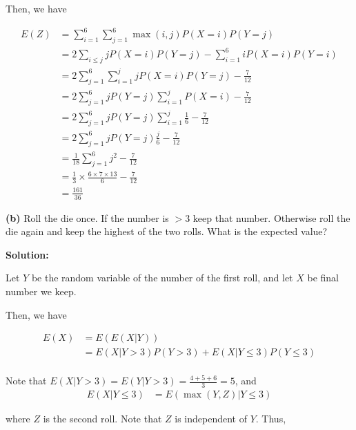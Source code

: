 \documentclass[11pt]{article}
\renewcommand\part[1]{\vspace{.10in}\textbf{(#1)}}
\newcommand{\solution}{\vspace{.10in}\textbf{Solution: }}
\begin{document}
Then, we have

\begin{align*}
    E(Z) &= \sum_{i=1}^{6}\sum_{j=1}^{6}\max(i,j)P(X=i)P(Y=j) \\
         &= 2\sum_{i \le j}jP(X=i)P(Y=j) - \sum_{i=1}^{6}iP(X=i)P(Y=i) \\
         &= 2\sum_{j=1}^{6}\sum_{i=1}^{j} jP(X=i)P(Y=j) - \frac{7} {12} \\
         &= 2\sum_{j=1}^{6} jP(Y=j) \sum_{i=1}^{j} P(X=i) - \frac{7} {12}\\
         &= 2\sum_{j=1}^{6} jP(Y=j) \sum_{i=1}^{j} \frac{1}{6}- \frac{7} {12} \\
         &= 2\sum_{j=1}^{6} jP(Y=j) \frac{j}{6} - \frac{7} {12}\\
         &= \frac{1}{18}\sum_{j=1}^{6} j^2 - \frac{7} {12}\\
         &= \frac{1}{3} \times \frac{6 \times 7 \times 13}{6} - \frac{7} {12}\\
         &= \frac{161}{36}
\end{align*}

\part{b} Roll the die once. If the number is $ > 3$ keep that number. Otherwise roll the die again and keep the highest of the two rolls. What is the expected value?

\solution

Let $Y$ be the random variable of the number of the first roll, and let $X$ be final number we keep.

Then, we have

\begin{align*}
    E(X) &= E(E(X|Y)) \\
         &= E(X|Y>3)P(Y>3) + E(X|Y\le 3)P(Y\le 3) \\
\end{align*}

Note that $E(X|Y>3) = E(Y|Y>3) = \frac{4+5+6}{3} = 5$, and 
\begin{align*}
    E(X|Y \le 3) &= E(\max(Y, Z) | Y \le 3)
\end{align*}
    
    where $Z$ is the second roll. Note that $Z$ is independent of $Y$. Thus,
\end{document}
